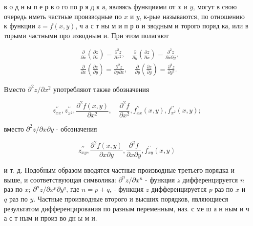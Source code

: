 \documentclass[10pt]{article}
\begin{document}
в о д н ы п е р в о го по р я д к а, являясь функциями от $x$ и $y$, могут в свою очередь иметь частные производные по $x$ и $y$, к-рые называются, по отношению к функции $z=f(x, y)$, ч а с т ны м и п р о и зводным и торого поряд ка, или в торыми частными про изводным и. При этом полагают



\[

\begin{aligned}

& \frac{\partial}{\partial x}\left(\frac{\partial z}{\partial x}\right)=\frac{\partial^{2} z}{\partial x^{2}}, \quad \frac{\partial}{\partial y}\left(\frac{\partial z}{\partial x}\right)=\frac{\partial^{2} z}{\partial x \partial y}, \\

& \frac{\partial}{\partial x}\left(\frac{\partial z}{\partial y}\right)=\frac{\partial^{2} z}{\partial y \partial x}, \quad \frac{\partial}{\partial y}\left(\frac{\partial z}{\partial y}\right)=\frac{\partial^{2} z}{\partial y^{2}} .

\end{aligned}

\]



Вместо $\partial^{2} z / \partial x^{2}$ употребляют также обозначения



\[

z_{x x}^{\prime \prime}, z_{x^{2}}^{\prime \prime}, \frac{\partial^{2} f(x, y)}{\partial x^{2}}, \quad \frac{\partial^{2} f}{\partial x^{2}}, f_{x x}^{\prime \prime}(x, y), f_{x^{2}}^{\prime \prime}(x, y) ;

\]



вместо $\partial^{2} z / \partial x \partial y$ - обозначения



\[

z_{x y}^{\prime \prime}, \frac{\partial^{2} f(x, y)}{\partial x \partial y}, \frac{\partial^{2} f}{\partial x \partial y}, f_{x y}^{\prime \prime}(x, y)

\]



и т. д. Подобным образом вводятся частные производные третьего порядка и выше, и соответствующая символика: $\partial^{n} z / \partial x^{n}$ - функция $z$ дифференцируется $n$ раз по $x$; $\partial^{n} z / \partial x^{p} \partial y^{q}$, где $n=p+q$, - функция $z$ дифференцируется $p$ раз по $x$ и $q$ раз по $y$. Частные производные второго и высших порядков, являющиеся результатом дифференцирования по разным переменным, наз. с ме ш а н ным и ч а с т ным и произ во дн ы м и.
\end{document}
